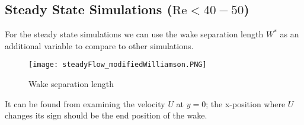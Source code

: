 	\subsection{Steady State Simulations ($\text{Re} < 40-50$)}
	For the steady state simulations we can use the wake separation length $W^*$ as an additional variable to compare to other simulations.
			\begin{figure}[htp]
				\centering
				\texttt{[image: steadyFlow\_modifiedWilliamson.PNG]}
				\caption{Wake separation length }
				\label{fig:wakeSeparation}
			\end{figure} 
	It can be found from examining the velocity $U$ at $y=0$; the x-position where $U$ changes its sign should be the end position of the wake.
%
%	
